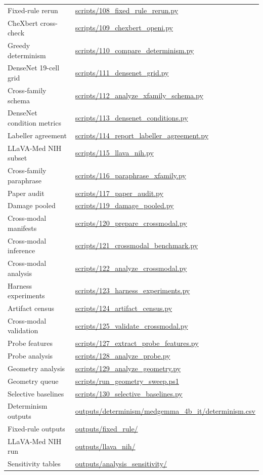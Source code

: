 \begin{table}[H]
\begin{tabular}{ll}
Fixed-rule rerun & \url{scripts/108_fixed_rule_rerun.py} \\
CheXbert cross-check & \url{scripts/109_chexbert_openi.py} \\
Greedy determinism & \url{scripts/110_compare_determinism.py} \\
DenseNet 19-cell grid & \url{scripts/111_densenet_grid.py} \\
Cross-family schema & \url{scripts/112_analyze_xfamily_schema.py} \\
DenseNet condition metrics & \url{scripts/113_densenet_conditions.py} \\
Labeller agreement & \url{scripts/114_report_labeller_agreement.py} \\
LLaVA-Med NIH subset & \url{scripts/115_llava_nih.py} \\
Cross-family paraphrase & \url{scripts/116_paraphrase_xfamily.py} \\
Paper audit & \url{scripts/117_paper_audit.py} \\
Damage pooled & \url{scripts/119_damage_pooled.py} \\
Cross-modal manifests & \url{scripts/120_prepare_crossmodal.py} \\
Cross-modal inference & \url{scripts/121_crossmodal_benchmark.py} \\
Cross-modal analysis & \url{scripts/122_analyze_crossmodal.py} \\
Harness experiments & \url{scripts/123_harness_experiments.py} \\
Artifact census & \url{scripts/124_artifact_census.py} \\
Cross-modal validation & \url{scripts/125_validate_crossmodal.py} \\
Probe features & \url{scripts/127_extract_probe_features.py} \\
Probe analysis & \url{scripts/128_analyze_probe.py} \\
Geometry analysis & \url{scripts/129_analyze_geometry.py} \\
Geometry queue & \url{scripts/run_geometry_sweep.ps1} \\
Selective baselines & \url{scripts/130_selective_baselines.py} \\
Determinism outputs & \url{outputs/determinism/medgemma_4b_it/determinism.csv} \\
Fixed-rule outputs & \url{outputs/fixed_rule/} \\
LLaVA-Med NIH run & \url{outputs/llava_nih/} \\
Sensitivity tables & \url{outputs/analysis_sensitivity/} \\

\end{tabular}
\end{table}
